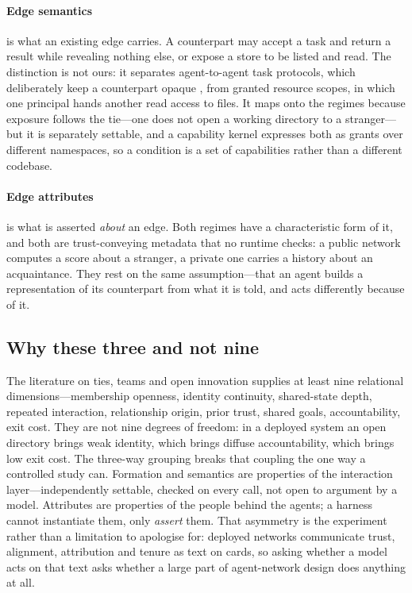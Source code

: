 \paragraph{Edge semantics} is what an existing edge carries. A counterpart may accept a
task and return a result while revealing nothing else, or expose a store to be listed
and read. The distinction is not ours: it separates agent-to-agent task protocols, which
deliberately keep a counterpart opaque \citep{a2a2025}, from granted resource scopes, in
which one principal hands another read access to files. It maps onto the regimes because
exposure follows the tie---one does not open a working directory to a stranger---but it
is separately settable, and a capability kernel expresses both as grants over different
namespaces, so a condition is a set of capabilities rather than a different codebase.

\paragraph{Edge attributes} is what is asserted \emph{about} an edge. Both regimes have
a characteristic form of it, and both are trust-conveying metadata that no runtime
checks: a public network computes a score about a stranger, a private one carries a
history about an acquaintance. They rest on the same assumption---that an agent builds
a representation of its counterpart from what it is told, and acts differently because
of it.

\fi

\subsection{Why these three and not nine}

The literature on ties, teams and open innovation supplies at least nine relational
dimensions---membership openness, identity continuity, shared-state depth, repeated
interaction, relationship origin, prior trust, shared goals, accountability, exit cost.
They are not nine degrees of freedom: in a deployed system an open directory brings weak
identity, which brings diffuse accountability, which brings low exit cost. The three-way
grouping breaks that coupling the one way a controlled study can. Formation and semantics
are properties of the interaction layer---independently settable, checked on every call,
not open to argument by a model. Attributes are properties of the people behind the agents;
a harness cannot instantiate them, only \emph{assert} them. That asymmetry is the
experiment rather than a limitation to apologise for: deployed networks communicate trust,
alignment, attribution and tenure as text on cards, so asking whether a model acts on that
text asks whether a large part of agent-network design does anything at all.

